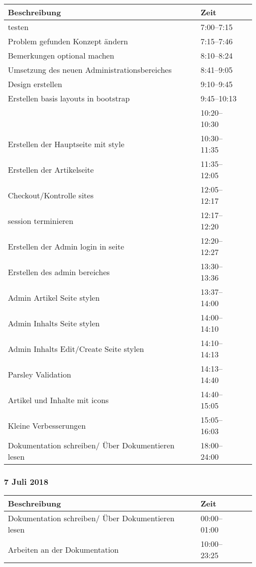 \documentclass[a4paper, 11pt]{article}
\begin{document}
\begin{tabular}{llr}
\toprule
Beschreibung & Zeit \\
\midrule
testen & 7:00--7:15 \\
Problem gefunden Konzept ändern & 7:15--7:46 \\
Bemerkungen optional machen & 8:10--8:24 \\
Umsetzung des neuen Administrationsbereiches & 8:41--9:05 \\
Design erstellen & 9:10--9:45 \\
Erstellen basis layouts in bootstrap & 9:45--10:13 \\
 & 10:20--10:30 \\
Erstellen der Hauptseite mit style & 10:30--11:35 \\
Erstellen der Artikelseite & 11:35--12:05 \\
Checkout/Kontrolle sites & 12:05--12:17 \\
session terminieren & 12:17--12:20 \\
Erstellen der Admin login in seite & 12:20--12:27 \\
Erstellen des admin bereiches & 13:30--13:36 \\
Admin Artikel Seite stylen & 13:37--14:00 \\
Admin Inhalts Seite stylen & 14:00--14:10 \\
Admin Inhalts Edit/Create Seite stylen & 14:10--14:13 \\
Parsley Validation & 14:13--14:40 \\
Artikel und Inhalte mit icons & 14:40--15:05 \\
Kleine Verbesserungen & 15:05--16:03 \\
Dokumentation schreiben/ Über Dokumentieren lesen & 18:00--24:00 \\
\bottomrule
\end{tabular}

\subsubsection{7 Juli 2018}

\begin{tabular}{llr}
\toprule
Beschreibung & Zeit \\
\midrule
Dokumentation schreiben/ Über Dokumentieren lesen & 00:00--01:00 \\
Arbeiten an der Dokumentation & 10:00--23:25 \\
\bottomrule
\end{tabular}
\end{document}

